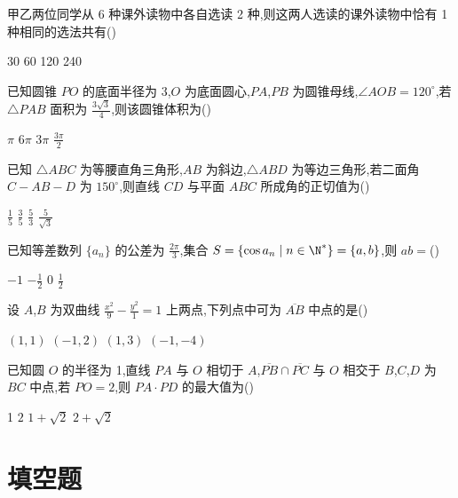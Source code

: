 \begin{problem}
甲乙两位同学从 6 种课外读物中各自选读 2 种,则这两人选读的课外读物中恰有 1 种相同的选法共有(\quad)

\choices
    {30}
    {60}
    {120}
    {240}
\end{problem}

\begin{problem}
已知圆锥 \(PO\) 的底面半径为 3,\(O\) 为底面圆心,\(PA\),\(PB\) 为圆锥母线,\(\angle AOB=120^\circ\),若 \(\triangle PAB\) 面积为 \( \frac{3\sqrt3}{4}\),则该圆锥体积为(\quad)

\choices
    {\(\pi\)}
    {\(6\pi\)}
    {\(3\pi\)}
    {\(\frac{3\pi}{2}\)}
\end{problem}

\begin{problem}
已知 \(\triangle ABC\) 为等腰直角三角形,\(AB\) 为斜边,\(\triangle ABD\) 为等边三角形,若二面角 \(C-AB-D\) 为 \(150^\circ\),则直线 \(CD\) 与平面 \(ABC\) 所成角的正切值为(\quad)

\choices
    {\(\frac15\)}
    {\(\frac{3}{5}\)}
    {\(\frac{5}{3}\)}
    {\(\frac{5}{\sqrt3}\)}
\end{problem}

\begin{problem}
已知等差数列 \(\{a_n\}\) 的公差为 \(\frac{2\pi}{3}\),集合 \(S=\{\cos a_n\mid n\in\N^*\}=\{a,b\}\),则 \(ab=\)(\quad)

\choices
    {\(-1\)}
    {\(-\frac12\)}
    {0}
    {\(\frac12\)}
\end{problem}

\begin{problem}
设 \(A\),\(B\) 为双曲线 \(\frac{x^2}{9}-\frac{y^2}{1}=1\) 上两点,下列点中可为 \(\overline{AB}\) 中点的是(\quad)

\choices
    {\((1,1)\)}
    {\((-1,2)\)}
    {\((1,3)\)}
    {\((-1,-4)\)}
\end{problem}

\begin{problem}
已知圆 \(O\) 的半径为 1,直线 \(PA\) 与 \(O\) 相切于 \(A\),\(\overline{PB}\cap\overline{PC}\) 与 \(O\) 相交于 \(B\),\(C\),\(D\) 为 \(BC\) 中点,若 \(PO=2\),则 \(PA\cdot PD\) 的最大值为(\quad)

\choices
    {1}
    {\(2\)}
    {\(1+\sqrt2\)}
    {\(2+\sqrt2\)}
\end{problem}

\section{填空题}

